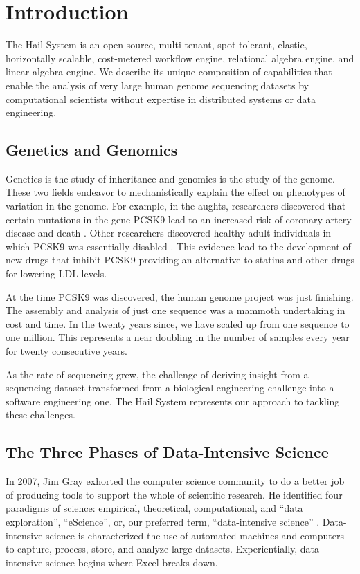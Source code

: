 \documentclass[sigconf, nonacm]{acmart}
\begin{document}
\section{Introduction}

The Hail System is an open-source, multi-tenant, spot-tolerant, elastic, horizontally scalable,
cost-metered workflow engine, relational algebra engine, and linear algebra engine. We describe its
unique composition of capabilities that enable the analysis of very large human genome sequencing
datasets by computational scientists without expertise in distributed systems or data engineering.

\subsection{Genetics and Genomics}

Genetics is the study of inheritance and genomics is the study of the genome. These two fields
endeavor to mechanistically explain the effect on phenotypes of variation in the genome. For
example, in the aughts, researchers discovered that certain mutations in the gene PCSK9 lead to an
increased risk of coronary artery disease and death \cite{Hall2013-us}\cite{Abifadel2003-lb}. Other
researchers discovered healthy adult individuals in which PCSK9 was essentially disabled
\cite{pcsk9-insights}. This evidence lead to the development of new drugs that inhibit PCSK9
providing an alternative to statins and other drugs for lowering LDL levels.

At the time PCSK9 was discovered, the human genome project was just finishing. The assembly and
analysis of just one sequence was a mammoth undertaking in cost and time. In the twenty years since,
we have scaled up from one sequence to one million. This represents a near doubling in the number of
samples every year for twenty consecutive years.

As the rate of sequencing grew, the challenge of deriving insight from a sequencing dataset
transformed from a biological engineering challenge into a software engineering one. The Hail System
represents our approach to tackling these challenges.

\subsection{The Three Phases of Data-Intensive Science}

In 2007, Jim Gray exhorted the computer science community to do a better job of producing tools to
support the whole of scientific research. He identified four paradigms of science: empirical,
theoretical, computational, and ``data exploration'', ``eScience'', or, our preferred term,
``data-intensive science'' \cite{fourthparadigm-chapter-1}. Data-intensive science is characterized
the use of automated machines and computers to capture, process, store, and analyze large
datasets. Experientially, data-intensive science begins where Excel breaks down.
\end{document}
